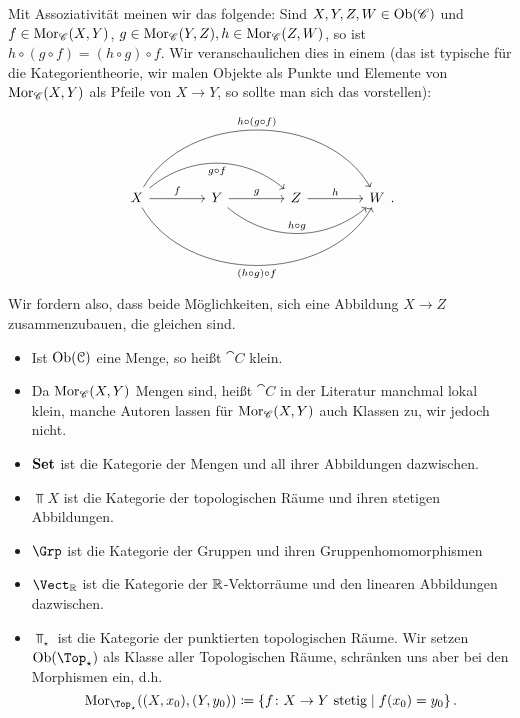 \begin{remark*}
    Mit Assoziativität meinen wir das folgende: Sind $X,Y,Z,W\in \operatorname{Ob}(\mathscr{C})$ und $f\in \operatorname{Mor}_{\mathscr{C}}(X,Y)$, $g\in \operatorname{Mor}_{\mathscr{C}}(Y,Z), h\in \operatorname{Mor}_{\mathscr{C}}(Z,W)$, so ist $h \circ  (g \circ f) = (h \circ  g) \circ  f$. Wir veranschaulichen dies in einem  (das ist typische für die Kategorientheorie, wir malen Objekte als Punkte und Elemente von $\operatorname{Mor}_{\mathscr{C}}(X,Y)$ als Pfeile von $X\to Y$, so sollte man sich das vorstellen):
    \[
    \begin{tikzcd}[column sep = 4em, row sep = 4em]
        X \ar[bend left = 60]{rrr}{h \circ  (g \circ  f)} \ar[bend right = 60, swap]{rrr}{(h \circ  g) \circ f}\ar[bend left = 40,swap]{rr}{g \circ  f}\ar{r}{f} & Y\ar[bend right = 40]{rr}{h \circ  g} \ar{r}{g} & Z \ar{r}{h} & W
    \end{tikzcd}
    .\] 
    Wir fordern also, dass beide Möglichkeiten, sich eine Abbildung $X\to Z$ zusammenzubauen, die gleichen sind.
\end{remark*}


\begin{remark}
    \begin{itemize}
        \item Ist $\operatorname{Ob}(\mathcal{C})$ eine Menge, so heißt $\cat{C}$ klein.
        \item Da $\operatorname{Mor}_{\mathscr{C}}(X,Y)$ Mengen sind, heißt $\cat{C}$ in der Literatur manchmal lokal klein, manche Autoren lassen für $\operatorname{Mor}_{\mathscr{C}}(X,Y)$ auch Klassen zu, wir jedoch nicht.
    \end{itemize}
\end{remark}

\begin{example}
    \begin{itemize}
        \item $\operatorname{\textbf{Set}}$ ist die Kategorie der Mengen und all ihrer Abbildungen dazwischen.
        \item $\Top X$ ist die Kategorie der topologischen Räume und ihren stetigen Abbildungen.
        \item $\Grp$ ist die Kategorie der Gruppen und ihren Gruppenhomomorphismen
        \item  $\Vect_{\R}$ ist die Kategorie der $\mathbb{R}$-Vektorräume und den linearen Abbildungen dazwischen.
        \item $\Top_{\star}$ ist die Kategorie der punktierten topologischen Räume. Wir setzen $\Ob(\Top_{\star })$ als Klasse aller Topologischen Räume, schränken uns aber bei den Morphismen ein, d.h.
            \[
                \Mor_{\Top_{\star }}((X,x_0),(Y,y_0)) \coloneqq  \left \{f \colon X \to  Y \text{ stetig}\mid  f(x_0) = y_0\right\} 
            .\] 
    \end{itemize}
\end{example}

